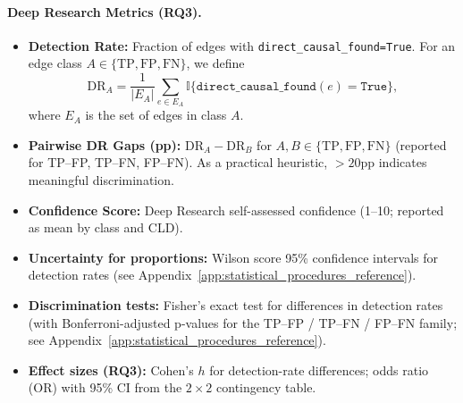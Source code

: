 \paragraph{Deep Research Metrics (RQ3).}
\begin{itemize}[noitemsep]
    \item \textbf{Detection Rate:} Fraction of edges with \texttt{direct\_causal\_found=True}. For an edge class \(A\in\{\text{TP},\text{FP},\text{FN}\}\), we define
    \[
    \text{DR}_{A}=\frac{1}{|E_A|}\sum_{e\in E_A}\mathbb{I}\{\texttt{direct\_causal\_found}(e)=\texttt{True}\},
    \]
    where \(E_A\) is the set of edges in class \(A\).
    \item \textbf{Pairwise DR Gaps (pp):} $\text{DR}_{A} - \text{DR}_{B}$ for $A,B\in\{\text{TP},\text{FP},\text{FN}\}$ (reported for TP--FP, TP--FN, FP--FN). As a practical heuristic, $>20$pp indicates meaningful discrimination.
    \item \textbf{Confidence Score:} Deep Research self-assessed confidence (1--10; reported as mean by class and CLD).
    \item \textbf{Uncertainty for proportions:} Wilson score 95\% confidence intervals for detection rates (see Appendix~\ref{app:statistical_procedures_reference}).
    \item \textbf{Discrimination tests:} Fisher's exact test for differences in detection rates (with Bonferroni-adjusted p-values for the TP--FP / TP--FN / FP--FN family; see Appendix~\ref{app:statistical_procedures_reference}).
    \item \textbf{Effect sizes (RQ3):} Cohen's $h$ for detection-rate differences; odds ratio (OR) with 95\% CI from the $2\times2$ contingency table.
\end{itemize}

